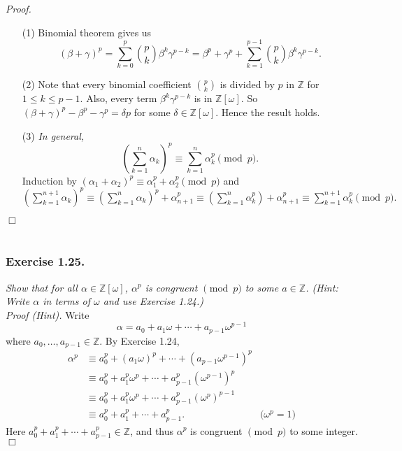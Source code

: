 \documentclass{article}
\begin{document}
\emph{Proof.}
\begin{enumerate}
\item[(1)]
Binomial theorem gives us
$$
(\beta+\gamma)^p
= \sum_{k=0}^{p}{p \choose k}\beta^k\gamma^{p-k}
= \beta^p+\gamma^p + \sum_{k=1}^{p-1}{p \choose k}\beta^k\gamma^{p-k}.$$
\item[(2)]
Note that every binomial coefficient ${p \choose k}$ is divided by $p$ in $\mathbb{Z}$
for $1 \leq k \leq p-1$.
Also, every term $\beta^k\gamma^{p-k}$ is in $\mathbb{Z}[\omega]$.
So $(\beta+\gamma)^p - \beta^p - \gamma^p = \delta p$
for some $\delta \in \mathbb{Z}[\omega]$.
Hence the result holds.
\item[(3)]
\emph{In general,}
$$\left( \sum_{k=1}^{n} \alpha_k \right)^p
\equiv \sum_{k=1}^{n} \alpha_k^p \pmod{p}.$$
Induction by
$(\alpha_1+\alpha_2)^p \equiv \alpha_1^p + \alpha_2^p \pmod{p}$
and
$\left( \sum_{k=1}^{n+1} \alpha_k \right)^p
\equiv \left( \sum_{k=1}^{n} \alpha_k \right)^p + \alpha_{n+1}^p
\equiv \left( \sum_{k=1}^{n} \alpha_k^p \right) + \alpha_{n+1}^p
\equiv \sum_{k=1}^{n+1} \alpha_k^p \pmod{p}.$
\end{enumerate}
$\Box$ \\\\






\subsubsection*{Exercise 1.25.}
\emph{Show that for all $\alpha \in \mathbb{Z}[\omega]$,
$\alpha^p$ is congruent $\pmod{p}$ to some $a \in \mathbb{Z}$.
(Hint: Write $\alpha$ in terms of $\omega$ and use Exercise 1.24.) } \\

\emph{Proof (Hint).}
Write $$\alpha = a_0 + a_1 \omega + \cdots + a_{p-1} \omega^{p-1}$$
where $a_0, \ldots, a_{p-1} \in \mathbb{Z}$.
By Exercise 1.24,
\begin{align*}
\alpha^p
&\equiv a_0^p + (a_1 \omega)^p + \cdots + (a_{p-1} \omega^{p-1})^p \\
&\equiv a_0^p + a_1^p \omega^p + \cdots + a_{p-1}^p (\omega^{p-1})^p \\
&\equiv a_0^p + a_1^p \omega^p + \cdots + a_{p-1}^p (\omega^p)^{p-1} \\
&\equiv a_0^p + a_1^p + \cdots + a_{p-1}^p.
  &\text{($\omega^p = 1$)}
\end{align*}
Here $a_0^p + a_1^p + \cdots + a_{p-1}^p \in \mathbb{Z}$,
and thus $\alpha^p$ is congruent $\pmod{p}$ to some integer.
$\Box$ \\\\
\end{document}
